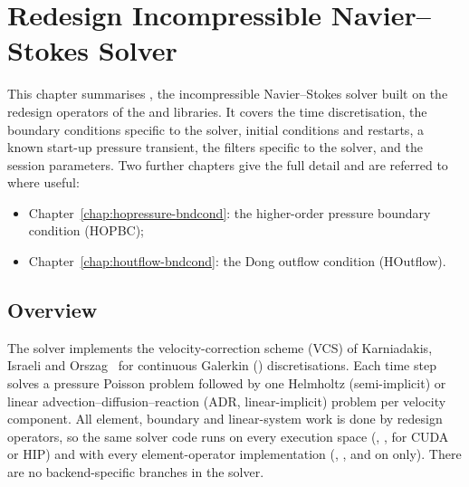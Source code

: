 \chapter{Redesign Incompressible Navier--Stokes Solver}
\label{chap:incns}

\newcommand{\incnsv}[1]{\boldsymbol{#1}}
\newcommand{\incnsdt}{\Delta t}
\newcommand{\incnsCC}{\nabla\times\nabla\times}

\sloppy

This chapter summarises , the
incompressible Navier--Stokes solver built on the redesign operators of
the  and  libraries. It covers the time
discretisation, the boundary conditions specific to the solver, initial
conditions and restarts, a known start-up pressure transient, the filters
specific to the solver, and the session parameters. Two further chapters give the full detail and are
referred to where useful:
\begin{itemize}
  \item Chapter~\ref{chap:hopressure-bndcond}: the higher-order pressure
  boundary condition (HOPBC);
  \item Chapter~\ref{chap:houtflow-bndcond}: the Dong outflow condition
  (HOutflow).
\end{itemize}

\section{Overview}
\label{sec:incns-overview}

The solver implements the velocity-correction scheme (VCS) of Karniadakis,
Israeli and Orszag~\cite{Karniadakis1991} for continuous Galerkin
() discretisations. Each time step solves a
pressure Poisson problem followed by one Helmholtz (semi-implicit) or linear
advection--diffusion--reaction (ADR, linear-implicit) problem per velocity
component. All element, boundary and linear-system work is done by
redesign operators, so the same solver code runs on every execution space
(, ,  for CUDA or HIP) and with every
element-operator implementation (, , and
 on  only). There are no backend-specific
branches in the solver.

